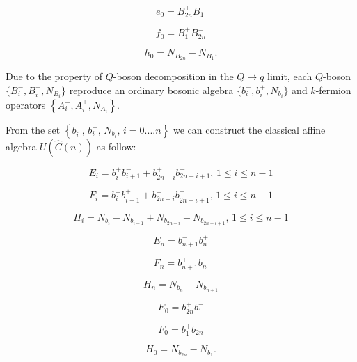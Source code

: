 \documentclass[a4paper,12pt,thmsa]{article}
\begin{document}
\begin{equation}
e_{0}=B_{2n}^{+}B_{1}^{-}
\end{equation}

\begin{equation}
f_{0}=B_{1}^{+}B_{2n}^{-}
\end{equation}

\begin{equation}
h_0=N_{B_{2n}}-N_{B_1}.
\end{equation}

Due to the property of $Q$-boson decomposition in the $Q\rightarrow q$
limit, each $Q$-boson $\{B_i^{-},B_i^{+},N_{B_i}\}$ reproduce an ordinary
bosonic algebra $\{b_i^{-},b_i^{+},N_{b_i}\}$ and $k$-fermion operators $%
\left\{ A_i^{-},A_i^{+},N_{A_i}\right\} .$

From the set $\left\{ b_i^{+},\, b_i^{-},\, N_{b_i},\, %
i=0....n\right\} $ we can construct the classical affine algebra $U(\hat
C(n))$ as follow:

\begin{equation}
E_i=b_i^{+}b_{i+1}^{-}+b_{2n-i}^{+}b_{2n-i+1}^{-},\, 1\leq i\leq
n-1
\end{equation}

\begin{equation}
F_i=b_i^{-}b_{i+1}^{+}+b_{2n-i}^{-}b_{2n-i+1}^{+},\, 1\leq i\leq
n-1
\end{equation}

\begin{equation}
H_i=N_{b_i}-N_{b_{i+1}}+N_{b_{2n-i}}-N_{b_{2n-i+1}},\, 1\leq i\leq
n-1
\end{equation}

\begin{equation}
E_{n}=b_{n+1}^{-}b_{n}^{+}
\end{equation}

\begin{equation}
F_{n}=b_{n+1}^{+}b_{n}^{-}
\end{equation}

\begin{equation}
H_{n}=N_{b_{n}}-N_{b_{n+1}}
\end{equation}

\begin{equation}
E_{0}=b_{2n}^{+}b_{1}^{-}
\end{equation}

\begin{equation}
F_{0}=b_{1}^{+}b_{2n}^{-}
\end{equation}

\begin{equation}
H_0=N_{b_{2n}}-N_{b_1}.
\end{equation}
\end{document}
